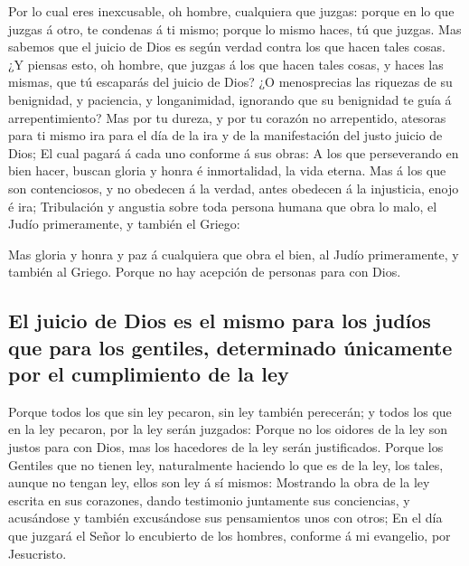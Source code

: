  Por lo cual eres inexcusable, oh hombre, cualquiera que
juzgas: porque en lo que juzgas á otro, te condenas á ti mismo; porque
lo mismo haces, tú que juzgas.  Mas sabemos que el juicio
de Dios es según verdad contra los que hacen tales cosas. 
¿Y piensas esto, oh hombre, que juzgas á los que hacen tales cosas, y
haces las mismas, que tú escaparás del juicio de Dios?  ¿O
menosprecias las riquezas de su benignidad, y paciencia, y longanimidad,
ignorando que su benignidad te guía á arrepentimiento? 
Mas por tu dureza, y por tu corazón no arrepentido, atesoras para ti
mismo ira para el día de la ira y de la manifestación del justo juicio
de Dios;  El cual pagará á cada uno conforme á sus obras:
 A los que perseverando en bien hacer, buscan gloria y
honra é inmortalidad, la vida eterna.  Mas á los que son
contenciosos, y no obedecen á la verdad, antes obedecen á la injusticia,
enojo é ira;  Tribulación y angustia sobre toda persona
humana que obra lo malo, el Judío primeramente, y también el Griego:

 Mas gloria y honra y paz á cualquiera que obra el bien,
al Judío primeramente, y también al Griego.  Porque no
hay acepción de personas para con Dios.

\hypertarget{el-juicio-de-dios-es-el-mismo-para-los-juduxedos-que-para-los-gentiles-determinado-uxfanicamente-por-el-cumplimiento-de-la-ley}{%
\subsection{El juicio de Dios es el mismo para los judíos que para los
gentiles, determinado únicamente por el cumplimiento de la
ley}\label{el-juicio-de-dios-es-el-mismo-para-los-juduxedos-que-para-los-gentiles-determinado-uxfanicamente-por-el-cumplimiento-de-la-ley}}

 Porque todos los que sin ley pecaron, sin ley también
perecerán; y todos los que en la ley pecaron, por la ley serán juzgados:
 Porque no los oidores de la ley son justos para con
Dios, mas los hacedores de la ley serán justificados. 
Porque los Gentiles que no tienen ley, naturalmente haciendo lo que es
de la ley, los tales, aunque no tengan ley, ellos son ley á sí mismos:
 Mostrando la obra de la ley escrita en sus corazones,
dando testimonio juntamente sus conciencias, y acusándose y también
excusándose sus pensamientos unos con otros;  En el día
que juzgará el Señor lo encubierto de los hombres, conforme á mi
evangelio, por Jesucristo.

